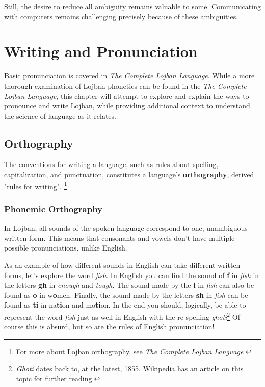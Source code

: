 \documentclass[12pt]{book}
\begin{document}
Still, the desire to reduce all ambiguity remains valuable to some. Communicating with computers remains challenging precisely because of these ambiguities. 




\section{Writing and Pronunciation}

Basic pronunciation is covered in \emph{The Complete Lojban Language}. \cite[Chapter 2, p.~16]{CLL} While a more thorough examination of Lojban phonetics can be found in the \emph{The Complete Lojban Language}, \cite[Chapter 3, p.~34]{CLL} this chapter will attempt to explore and explain the ways to pronounce and write Lojban, while providing additional context to understand the science of language as it relates.

\subsection{Orthography}

The conventions for writing a language, such as rules about spelling, capitalization, and punctuation, constitutes a language's \textbf{orthography}, derived "rules for writing". \footnote{For more about Lojban orthography, see \emph{The Complete Lojban Language} \cite[Chapter 3, p.~33]{CLL} }

\subsubsection{Phonemic Orthography}


In Lojban, all sounds of the spoken language correspond to one, unambiguous written form. This means that consonants and vowels don't have multiple possible pronunciations, unlike English. 

As an example of how different sounds in English can take different written forms, let's explore the word \emph{fish}. In English you can find the sound of \textbf{f} in \emph{fish} in the letters \textbf{gh} in \emph{enough} and \emph{tough}. The sound made by the \textbf{i} in \emph{fish} can also be found as \textbf{o} in w\textbf{o}men. Finally, the sound made by the letters \textbf{sh} in \emph{fish} can be found as \textbf{ti} in na\textbf{ti}on and mo\textbf{ti}on. In the end you should, logically, be able to represent the word \emph{fish} just as well in English with the re-spelling \emph{ghoti}\footnote{\emph{Ghoti} dates back to, at the latest, 1855. Wikipedia has an \href{https://en.wikipedia.org/wiki/Ghoti}{article} on this topic for further reading.} Of course this is absurd, but so are the rules of English pronunciation!
\end{document}
